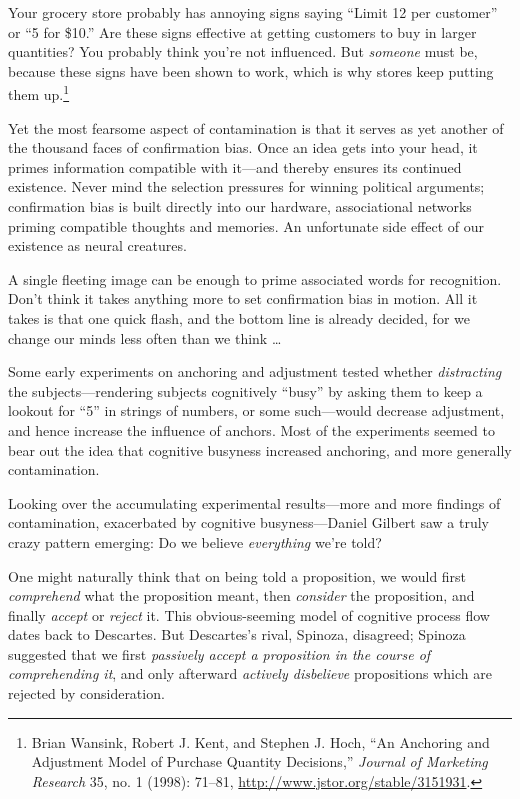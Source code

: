 {
 Your grocery store probably has annoying signs saying
``Limit 12 per customer'' or
``5 for \$10.'' Are these signs
effective at getting customers to buy in larger quantities? You
probably think you're not influenced. But
\textit{someone} must be, because these signs have been shown to work,
which is why stores keep putting them up.\footnote{Brian Wansink, Robert J. Kent, and Stephen J. Hoch,
``An Anchoring and Adjustment Model of Purchase
Quantity Decisions,'' \textit{Journal of Marketing
Research} 35, no. 1 (1998): 71--81,
\url{http://www.jstor.org/stable/3151931}.}}

{
 Yet the most fearsome aspect of contamination is that it serves as
yet another of the thousand faces of confirmation bias. Once an idea
gets into your head, it primes information compatible with it---and
thereby ensures its continued existence. Never mind the selection
pressures for winning political arguments; confirmation bias is built
directly into our hardware, associational networks priming compatible
thoughts and memories. An unfortunate side effect of our existence as
neural creatures.}

{
 A single fleeting image can be enough to prime associated words
for recognition. Don't think it takes anything more to
set confirmation bias in motion. All it takes is that one quick flash,
and the bottom line is already decided, for we change our minds less
often than we think \ldots}

\myendsectiontext


\bigskip


{
 Some early experiments on anchoring and adjustment tested whether
\textit{distracting} the subjects---rendering subjects cognitively
``busy'' by asking them to keep a
lookout for ``5'' in strings of
numbers, or some such---would decrease adjustment, and hence increase
the influence of anchors. Most of the experiments seemed to bear out
the idea that cognitive busyness increased anchoring, and more
generally contamination. }

{
 Looking over the accumulating experimental results---more and more
findings of contamination, exacerbated by cognitive busyness---Daniel
Gilbert saw a truly crazy pattern emerging: Do we believe
\textit{everything} we're told?}

{
 One might naturally think that on being told a proposition, we
would first \textit{comprehend} what the proposition meant, then
\textit{consider} the proposition, and finally \textit{accept} or
\textit{reject} it. This obvious-seeming model of cognitive process
flow dates back to Descartes. But Descartes's rival,
Spinoza, disagreed; Spinoza suggested that we first \textit{passively
accept a proposition in the course of comprehending it}, and only
afterward \textit{actively disbelieve} propositions which are rejected
by consideration.}

